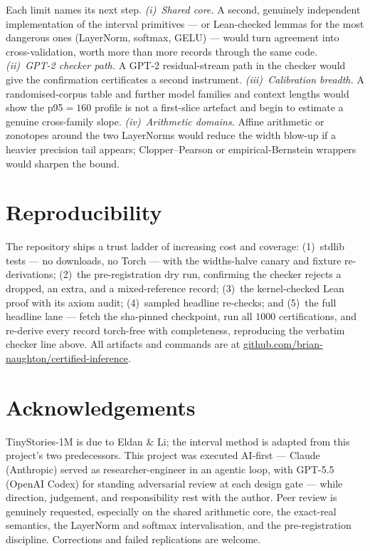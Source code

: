 \documentclass[11pt,a4paper]{article}
\begin{document}
Each limit names its next step. \emph{(i)~Shared core.} A second, genuinely independent implementation of the interval primitives --- or Lean-checked lemmas for the most dangerous ones (LayerNorm, softmax, GELU) --- would turn agreement into cross-validation, worth more than more records through the same code. \emph{(ii)~GPT-2 checker path.} A GPT-2 residual-stream path in the checker would give the confirmation certificates a second instrument. \emph{(iii)~Calibration breadth.} A randomised-corpus table and further model families and context lengths would show the p95\(=160\) profile is not a first-slice artefact and begin to estimate a genuine cross-family slope. \emph{(iv)~Arithmetic domains.} Affine arithmetic or zonotopes around the two LayerNorms would reduce the width blow-up if a heavier precision tail appears; Clopper--Pearson or empirical-Bernstein wrappers would sharpen the bound.

\section{Reproducibility}

The repository ships a trust ladder of increasing cost and coverage: (1)~stdlib tests --- no downloads, no Torch --- with the widths-halve canary and fixture re-derivations; (2)~the pre-registration dry run, confirming the checker rejects a dropped, an extra, and a mixed-reference record; (3)~the kernel-checked Lean proof with its axiom audit; (4)~sampled headline re-checks; and (5)~the full headline lane --- fetch the sha-pinned checkpoint, run all \(1000\) certifications, and re-derive every record torch-free with completeness, reproducing the verbatim checker line above. All artifacts and commands are at \href{https://github.com/brian-naughton/certified-inference}{github.com/brian-naughton/certified-inference}.

\section*{Acknowledgements}

TinyStories-1M is due to Eldan \& Li; the interval method is adapted from this project's two predecessors. This project was executed AI-first --- Claude (Anthropic) served as researcher-engineer in an agentic loop, with GPT-5.5 (OpenAI Codex) for standing adversarial review at each design gate --- while direction, judgement, and responsibility rest with the author. Peer review is genuinely requested, especially on the shared arithmetic core, the exact-real semantics, the LayerNorm and softmax intervalisation, and the pre-registration discipline. Corrections and failed replications are welcome.
\end{document}
